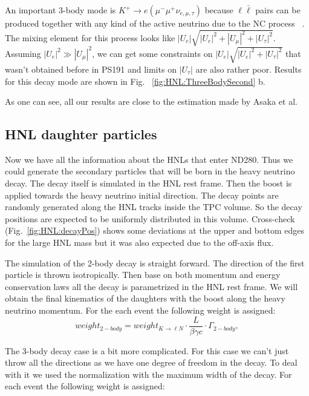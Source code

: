 \documentclass[../main.tex]{subfiles}
\begin{document}
An important 3-body mode is $K^+\rightarrow e(\mu^-\mu^+\nu_{e,\mu,\tau})$ because $\ell\bar{\ell}$ pairs can be produced together with any kind of the active neutrino due to  the NC process ~\cite{Johnson1997}. The mixing element for this process looks like $\left|U_{e}\right|\sqrt{\left|U_{e}\right|^2+\left|U_{\mu}\right|^2+\left|U_{\tau}\right|^2}$. Assuming $\left|U_e\right|^2 \gg\left|U_{\mu}\right|^2$, we can get some constraints on $\left|U_{e}\right|\sqrt{\left|U_{e}\right|^2+\left|U_{\tau}\right|^2}$ that wasn't obtained before in PS191 and limits on $\left|U_{\tau}\right|$ are also rather poor. Results for this decay mode are shown in Fig. ~\ref{fig:HNL:ThreeBodySecond} b.

As one can see, all our results are close to the estimation made by Asaka et al.

\subsection{HNL daughter particles}
Now we have all the information about the HNLs that enter ND280. Thus we could generate the secondary particles that will be born in the heavy neutrino decay. The decay itself is simulated in the HNL rest frame. Then the boost is applied towards the heavy neutrino initial direction. The decay points are randomly generated along the  HNL tracks inside the TPC volume. So the decay positions are expected to be uniformly distributed in this volume. Cross-check (Fig.~\ref{fig:HNL:decayPos}) shows some deviations at the upper and bottom edges for the large HNL mass but it was also expected due to the off-axis flux.

The simulation of the 2-body decay is straight forward. The direction of the first particle is thrown isotropically. Then base on both momentum and energy conservation laws all the decay is parametrized in the HNL rest frame. We will obtain the final kinematics of the daughters with the boost along the heavy neutrino momentum. For the each event the following weight is assigned:
\begin{equation}
    weight_{2-body}=weight_{K\rightarrow \ell N}\cdot\frac{L}{\beta\gamma c}\cdot\Gamma_{2-body},
\end{equation}

The 3-body decay case is a bit more complicated. For this case we can't just throw all the directions as we have one degree of freedom in the decay. To deal with it we used the normalization with the maximum width of the decay. For each event the following weight is assigned:
\end{document}

